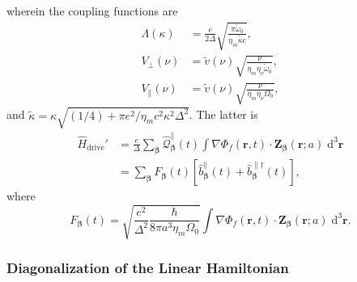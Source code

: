 \documentclass{article}
\begin{document}
wherein the coupling functions are
\begin{equation}\label{eq:couplingFunctions}
\begin{split}
\Lambda(\kappa) &= \frac{e}{2\Delta}\sqrt{\frac{\pi\tilde{\omega}_0}{\eta_m\tilde{\kappa}c}},\\
V_\perp(\nu) &= \tilde{v}(\nu)\sqrt{\frac{\nu}{\eta_m\eta_\nu\tilde{\omega}_0}},\\
V_\parallel(\nu) &= \tilde{v}(\nu)\sqrt{\frac{\nu}{\eta_m\eta_\nu\Omega_0}},
\end{split}
\end{equation}
and $\tilde{\kappa} = \kappa\sqrt{(1/4) + \pi e^2/\eta_mc^2\kappa^2\Delta^2}$. The latter is 
\begin{equation}
\begin{split}
\hat{H}_\mathrm{drive}' &= \frac{e}{\Delta}\sum_{\bm{\beta}}\hat{\mathcal{Q}}_{\bm{\beta}}^\parallel(t)\int\nabla\Phi_f(\mathbf{r},t)\cdot\mathbf{Z}_{\bm{\beta}}(\mathbf{r};a)\;\mathrm{d}^3\mathbf{r}\\
&= \sum_{\bm{\beta}}F_{\bm{\beta}}(t)\left[\hat{b}_{\bm{\beta}}^\parallel(t) + \hat{b}_{\bm{\beta}}^{\parallel\dagger}(t)\right],
\end{split}
\end{equation}
where
\begin{equation}
F_{\bm{\beta}}(t) = \sqrt{\frac{e^2}{\Delta^2}\frac{\hbar}{8\pi a^3\eta_m\Omega_0}}\int\nabla\Phi_f(\mathbf{r},t)\cdot\mathbf{Z}_{\bm{\beta}}(\mathbf{r};a)\;\mathrm{d}^3\mathbf{r}.
\end{equation}









\subsubsection{Diagonalization of the Linear Hamiltonian}
\end{document}
